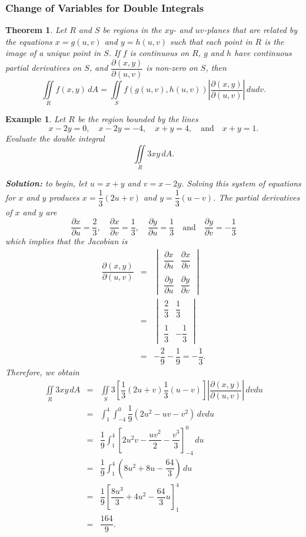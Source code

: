 \documentclass[titlepage,a4paper,12pt]{report}
\newtheorem{example}{Example}[section]
\newtheorem{theorem}{Theorem}[section]
\begin{document}
\subsubsection{Change of Variables for Double Integrals}
\begin{theorem}
Let $R$ and $S$ be regions in the $xy$- and $uv$-planes that are related by the equations $x=g(u,v)$ and $y=h(u,v)$ such that each point in $R$ is the image of a unique point in $S$. If $f$ is continuous on $R$, $g$ and $h$ have continuous partial derivatives on $S$, and $\dfrac{\partial (x,y)}{\partial (u,v)}$ is non-zero on $S$, then 
\[\iint \limits _R f(x,y)\, dA =\iint \limits _S f(g(u,v), h(u,v))\left|\dfrac{\partial (x,y)}{\partial (u,v)}\right|\, dudv.\] 
\end{theorem} 
\begin{example}
Let $R$ be the region bounded by the lines 
\[x-2y=0, \quad x-2y=-4, \quad x+y=4, \quad \mbox{and} \quad x+y=1.\] Evaluate the double integral 
\[\iint \limits _R 3xy\, dA.\]

\noindent \textbf{Solution:} to begin, let $u=x+y$ and $v=x-2y$. Solving this system of equations for $x$ and $y$ produces $x=\dfrac{1}{3}(2u+v)$ and $y=\dfrac{1}{3}(u-v)$. The partial derivatives of $x$ and $y$ are 
\[\dfrac{\partial x}{\partial u}=\dfrac{2}{3}, \quad \dfrac{\partial x}{\partial v}=\dfrac{1}{3}, \quad \dfrac{\partial y}{\partial u}=\dfrac{1}{3}\quad \mbox{and} \quad \dfrac{\partial y}{\partial v}=-\dfrac{1}{3}\] which implies that the Jacobian is 
\begin{eqnarray*}
\dfrac{\partial (x,y)}{\partial (u,v)} &=&\begin{vmatrix}
\dfrac{\partial x}{\partial u} & \dfrac{\partial x}{\partial v}\\~\\
\dfrac{\partial y}{\partial u} & \dfrac{\partial y}{\partial v}
\end{vmatrix} \\
&=& \begin{vmatrix}
\dfrac{2}{3} & \dfrac{1}{3} \\~\\
\dfrac{1}{3} & -\dfrac{1}{3}
\end{vmatrix} \\
&=& -\dfrac{2}{9}-\dfrac{1}{9}=-\dfrac{1}{3}.
\end{eqnarray*} 
Therefore, we obtain 
\begin{eqnarray*}
\iint \limits _R 3xy\, dA &=& \iint \limits _S 3\left[\dfrac{1}{3}(2u+v)\dfrac{1}{3}(u-v)\right]\left|\dfrac{\partial (x,y)}{\partial (u,v)}\right|\, dvdu\\
&=& \int _1^4 \int _{-4}^0 \dfrac{1}{9} (2u^2-uv-v^2)\, dvdu\\
&=& \dfrac{1}{9}\int _1^4 \left[ 2u^2v-\dfrac{uv^2}{2}-\dfrac{v^3}{3}\right]_{-4}^0\, du\\
&=& \dfrac{1}{9}\int _1^4 \left(8u^2+8u-\dfrac{64}{3}\right)\, du \\
&=&\dfrac{1}{9}\left[\dfrac{8u^3}{3}+4u^2-\dfrac{64}{3}u\right]_1^4 \\
&=&\dfrac{164}{9}.
\end{eqnarray*}
\end{example}
\end{document}
